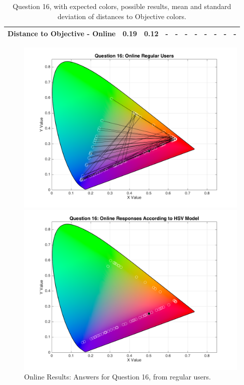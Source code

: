 \begin{table}[H]
{\begin{tabular}{lccccccccccccc}
    \multicolumn{4}{l}{Distance to Objective - Online}                                                                                               & \multicolumn{1}{|c}{0.19}        & \multicolumn{1}{c|}{0.12}    & \multicolumn{1}{|c}{-}        & \multicolumn{1}{c|}{-}    & \multicolumn{1}{|c}{-}       & \multicolumn{1}{c|}{-}    & \multicolumn{1}{|c}{-}        & \multicolumn{1}{c|}{-}    & \multicolumn{1}{|c}{-}       & \multicolumn{1}{c|}{-}    \\ \hline
    \end{tabular}}
  \caption[Question 16, with expected Results.]{Question 16, with expected colors, possible results, mean and standard deviation of distances to Objective colors.}
  \label{table:lab_q16_expected}
\end{table}
%
\begin{figure}[htbp]
  \centering
  \begin{minipage}{0.48\textwidth}
    \centering
    \includegraphics[width=\textwidth]{images/16_online_regularUsers.png}
    \caption[Online Results: Answers for Question 16, from regular users.]{Online Results: Answers for Question 16, from regular users.}
    \label{fig:onlineregular_16}
  \end{minipage}\hfill
  \begin{minipage}{0.48\textwidth}
    \centering
    \includegraphics[width=\textwidth]{images/16_online_HSVresponses.png}

\end{minipage}
\end{figure}
